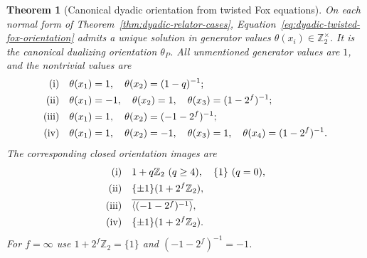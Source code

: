 \documentclass[11pt]{article}
\newtheorem{theorem}{Theorem}[section]
\theoremstyle{definition}
\begin{document}
\begin{theorem}[Canonical dyadic orientation from twisted Fox equations]
\label{thm:dyadic-twisted-fox-orientation}
On each normal form of Theorem~\ref{thm:dyadic-relator-cases},
Equation~\eqref{eq:dyadic-twisted-fox-orientation} admits
a unique solution in generator values
$\theta(x_i)\in\mathbb Z_2^\times$.
It is the canonical dualizing orientation $\theta_P$.
All unmentioned generator values are $1$, and the nontrivial
values are
\begin{align}
\textnormal{(i)}\quad&
 \theta(x_1)=1,\quad
 \theta(x_2)=(1-q)^{-1};\label{eq:dyadic-orientation-i}\\
\textnormal{(ii)}\quad&
 \theta(x_1)=-1,\quad\theta(x_2)=1,\quad
 \theta(x_3)=(1-2^f)^{-1};\label{eq:dyadic-orientation-ii}\\
\textnormal{(iii)}\quad&
 \theta(x_1)=1,\quad
 \theta(x_2)=(-1-2^f)^{-1};
 \label{eq:dyadic-orientation-iii}\\
\textnormal{(iv)}\quad&
 \theta(x_1)=1,\quad\theta(x_2)=-1,\quad
 \theta(x_3)=1,\quad\theta(x_4)=(1-2^f)^{-1}.
 \label{eq:dyadic-orientation-iv}
\end{align}
The corresponding closed orientation images are
\begin{equation}\label{eq:dyadic-orientation-images}
\begin{aligned}
\textnormal{(i)}\quad&
 1+q\mathbb Z_2\ (q\ge4),\quad\{1\}\ (q=0),\\
\textnormal{(ii)}\quad&
 \{\pm1\}(1+2^f\mathbb Z_2),\\
\textnormal{(iii)}\quad&
 \overline{\langle(-1-2^f)^{-1}\rangle},\\
\textnormal{(iv)}\quad&
 \{\pm1\}(1+2^f\mathbb Z_2).
\end{aligned}
\end{equation}
For $f=\infty$ use $1+2^f\mathbb Z_2=\{1\}$ and
$(-1-2^f)^{-1}=-1$.
\end{theorem}
\end{document}
